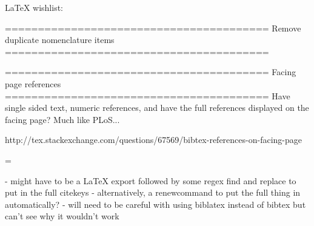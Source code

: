 LaTeX wishlist:

========================================
  Remove duplicate nomenclature items
========================================


========================================
  Facing page references
========================================
Have single sided text, numeric references, and have the full references displayed on the facing page? Much like PLoS...

http://tex.stackexchange.com/questions/67569/bibtex-references-on-facing-page

\usepackage[landscape,a3paper,left=21cm,marginparsep=1cm]{geometry}
\marginparwidth=\textwidth
\reversemarginpar
\usepackage[style=numeric]{biblatex}


\cite{bib2008}

	- might have to be a LaTeX export followed by some regex find and replace to put in the full citekeys
	- alternatively, a renewcommand to put the full thing in automatically?
	- will need to be careful with using {biblatex} instead of {bibtex} but can't see why it wouldn't work